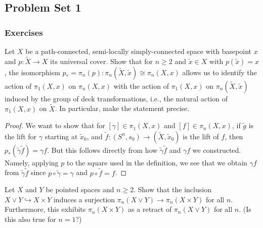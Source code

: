 \subsection{Problem Set 1}

\subsubsection{Exercises}


\begin{exercise}
    Let $X$ be a path-connected, semi-locally simply-connected
    space with basepoint $x$ and $p \colon \tilde{X}\to X$ its
    universal cover. Show that for $n\ge 2$ and
     $\tilde{x} \in X$ with $p (\tilde{x}) = x$, the isomorphism
     $p_* = \pi_n (p) \colon \pi_n \left( \tilde{X}, \tilde{x} \right) 
     \cong \pi_n(X, x)$ allows us to identify the
     action of $\pi_1 \left( X, x \right) $ on $\pi_n (X, x)$ with
     the action of $\pi_1 \left( X, x \right) $ on
     $\pi_n \left( \tilde{X}, \tilde{x} \right) $ induced by
     the group of deck transformations, i.e., the natural action
     of $\pi_1 (X, x)$ on $\tilde{X}$. In particular, make the
     statement precise.
\end{exercise}

\begin{proof}
    We want to show that for $\left[ \gamma \right] 
    \in \pi_1(X, x)$ and
    $\left[ f \right] \in \pi_n \left( X, x \right) $,
    if $\tilde{g}$ is the lift for $\gamma$ starting at
    $\tilde{x}_0$, and
    $\tilde{f} \colon \left( S^{n}, s_0 \right) 
    \to \left( \tilde{X}, \tilde{x}_0 \right) $ is the
    lift of $f$, then
    $p_* \left( \tilde{\gamma} \tilde{f} \right) 
    = \gamma f$. But this follows directly from how
    $\tilde{\gamma} \tilde{f}$ and 
    $\gamma f$ we constructed. Namely, applying
    $p$ to the square used in the definition, we see that we
    obtain $\gamma f$ from $\tilde{\gamma} \tilde{f}$ since
    $p \circ \tilde{\gamma} = \gamma$ and
    $p \circ \tilde{f} = f$.

\end{proof}


\begin{exercise}[]
    Let $X$ and $Y$ be pointed spaces and $n \ge 2$. Show that the
    inclusion $X \vee Y \hookrightarrow X \times Y$ induces
    a surjection $\pi_n \left( X \vee Y \right) 
    \to \pi_n \left( X \times Y \right) $ for all $n$. Furthermore,
    this exhibits $\pi_n \left( X \times Y \right) $ as
    a retract of $\pi_n \left( X \vee Y \right) $ for all $n$.
    (Is this also true for $n=1$?)
\end{exercise}

